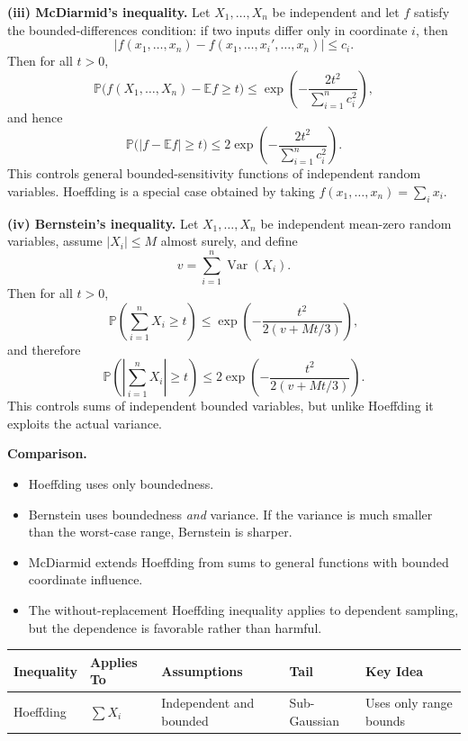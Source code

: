 \documentclass[11pt]{article}
\newcommand{\E}{\mathbb{E}}
\newcommand{\Pbb}{\mathbb{P}}
\begin{document}
\begin{solutionbox}
\medskip
\textbf{(iii) McDiarmid's inequality.}
Let $X_1,\dots,X_n$ be independent and let $f$ satisfy the bounded-differences condition:
if two inputs differ only in coordinate $i$, then
\[
|f(x_1,\dots,x_n)-f(x_1,\dots,x_i',\dots,x_n)|\le c_i.
\]
Then for all $t>0$,
\[
\Pbb\bigl(f(X_1,\dots,X_n)-\E f\ge t\bigr)
\le
\exp\!\left(-\frac{2t^2}{\sum_{i=1}^n c_i^2}\right),
\]
and hence
\[
\Pbb\bigl(|f-\E f|\ge t\bigr)
\le
2\exp\!\left(-\frac{2t^2}{\sum_{i=1}^n c_i^2}\right).
\]
This controls general bounded-sensitivity functions of independent random variables. Hoeffding is a special case obtained by taking $f(x_1,\dots,x_n)=\sum_i x_i$.

\medskip
\textbf{(iv) Bernstein's inequality.}
Let $X_1,\dots,X_n$ be independent mean-zero random variables, assume $|X_i|\le M$ almost surely, and define
\[
v=\sum_{i=1}^n \operatorname{Var}(X_i).
\]
Then for all $t>0$,
\[
\Pbb\left(\sum_{i=1}^n X_i\ge t\right)
\le
\exp\!\left(-\frac{t^2}{2(v+Mt/3)}\right),
\]
and therefore
\[
\Pbb\left(\left|\sum_{i=1}^n X_i\right|\ge t\right)
\le
2\exp\!\left(-\frac{t^2}{2(v+Mt/3)}\right).
\]
This controls sums of independent bounded variables, but unlike Hoeffding it exploits the actual variance.

\medskip
\textbf{Comparison.}
\begin{itemize}[leftmargin=2em]
    \item Hoeffding uses only boundedness.
    \item Bernstein uses boundedness \emph{and} variance. If the variance is much smaller than the worst-case range, Bernstein is sharper.
    \item McDiarmid extends Hoeffding from sums to general functions with bounded coordinate influence.
    \item The without-replacement Hoeffding inequality applies to dependent sampling, but the dependence is favorable rather than harmful.
\end{itemize}

\medskip
\begin{center}
\small
\renewcommand{\arraystretch}{1.2}
\begin{tabularx}{0.96\linewidth}{@{}p{2.4cm} p{2.4cm} X p{1.9cm} X@{}}
\toprule
\textbf{Inequality} & \textbf{Applies To} & \textbf{Assumptions} & \textbf{Tail} & \textbf{Key Idea} \\
\midrule
Hoeffding 
& $\sum X_i$ 
& Independent and bounded 
& Sub-Gaussian 
& Uses only range bounds \\


\end{tabularx}
\end{center}
\end{solutionbox}
\end{document}
